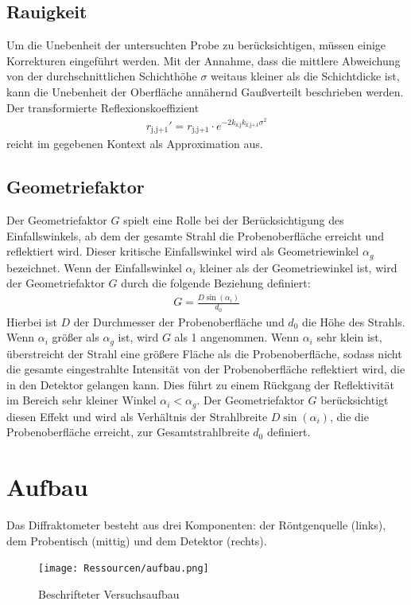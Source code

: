 \documentclass[12pt]{article}
\begin{document}
\subsection{Rauigkeit}{\label{subsec:rauigkeit}}
Um die Unebenheit der untersuchten Probe zu berücksichtigen, müssen einige Korrekturen eingeführt werden.
Mit der Annahme, dass die mittlere Abweichung von der durchschnittlichen Schichthöhe $\sigma$ weitaus kleiner als die Schichtdicke ist, kann die Unebenheit der Oberfläche annähernd Gaußverteilt beschrieben werden.
Der transformierte Reflexionskoeffizient
\begin{align}
    r_\text{j,j+1}'=r_\text{j,j+1}\cdot e^{-2k_\text{z,j}k_\text{z,j+1}\sigma^2}
\end{align}
reicht im gegebenen Kontext als Approximation aus.
\subsection{Geometriefaktor}
Der Geometriefaktor $ G $ spielt eine Rolle bei der Berücksichtigung des Einfallswinkels, ab dem der gesamte Strahl die Probenoberfläche erreicht und reflektiert wird. Dieser kritische Einfallswinkel wird als Geometriewinkel $ \alpha_g $ bezeichnet. Wenn der Einfallswinkel $ \alpha_i $ kleiner als der Geometriewinkel ist, wird der Geometriefaktor $ G $ durch die folgende Beziehung definiert:
\begin{align}
G = \frac{D \sin(\alpha_i)}{d_0}\label{eqn:G}
\end{align}
Hierbei ist $ D $ der Durchmesser der Probenoberfläche und $ d_0 $ die Höhe des Strahls. Wenn $ \alpha_i $ größer als $ \alpha_g $ ist, wird $ G $ als 1 angenommen.
Wenn $ \alpha_i $ sehr klein ist, überstreicht der Strahl eine größere Fläche als die Probenoberfläche, sodass nicht die gesamte eingestrahlte Intensität von der Probenoberfläche reflektiert wird, die in den Detektor gelangen kann. Dies führt zu einem Rückgang der Reflektivität im Bereich sehr kleiner Winkel $ \alpha_i < \alpha_g $. Der Geometriefaktor $ G $ berücksichtigt diesen Effekt und wird als Verhältnis der Strahlbreite $ D \sin(\alpha_i) $, die die Probenoberfläche erreicht, zur Gesamtstrahlbreite $ d_0 $ definiert.
\section{Aufbau}
Das Diffraktometer besteht aus drei Komponenten: der Röntgenquelle (links), dem Probentisch (mittig) und dem Detektor (rechts).
\begin{figure}[H]
  \centering
  \texttt{[image: Ressourcen/aufbau.png]}
  \caption{Beschrifteter Versuchsaufbau}\label{fig:5}
\end{figure}
\end{document}
